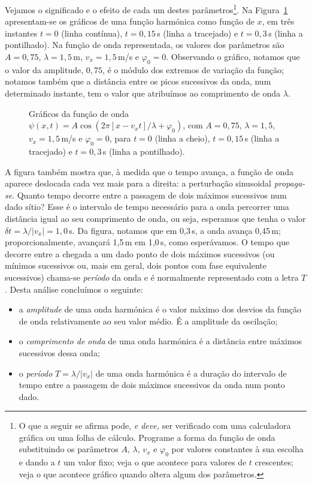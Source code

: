 Vejamos o significado e o efeito de cada um destes parâmetros\footnote{O que a
seguir se afirma pode, \emph{e deve,} ser verificado com uma calculadora
gráfica ou uma folha de cálculo. Programe a forma da função de onda
substituindo os parâmetros $A$, $\lambda$, $v_x$ e $\varphi_0$ por valores
constantes à sua escolha e dando a $t$ um valor fixo; veja o que acontece para
valores de $t$ crescentes; veja o que acontece gráfico quando altera algum dos
parâmetros.}.
Na Figura~\ref{fig:20-050} apresentam\--se os gráficos de uma função harmónica
como função de $x$, em três instantes $t=0$ (linha contínua), $t=0,15$\,s (linha
a tracejado) e $t=0,3$\,s (linha a pontilhado). Na função de onda representada, os
valores dos parâmetros são $A=0,75$, $\lambda=1,5$\,m, $v_x=1,5$\,m/s e
$\varphi_0=0$.  Observando o gráfico, notamos que o valor da amplitude, $0,75$,
é o módulo dos extremos de variação da função; notamos também que a distância
entre os picos sucessivos da onda, num determinado instante, tem o valor que
atribuímos ao comprimento de onda $\lambda$.
\begin{figure}[htb]
{\centering
    \par
}
\caption{Gráficos da função de onda
$\psi(x,t)=A\cos(2\pi[x-v_xt]/\lambda+\varphi_0)$, com $A=0,75$, $\lambda=1,5$,
$v_x=1,5$\,m/s e $\varphi_0=0$, para $t=0$ (linha a cheio), $t=0,15$\,s (linha a
tracejado) e $t=0,3$\,s (linha a pontilhado).\label{fig:20-050}}
\end{figure}
A figura também mostra que, à medida que o tempo avança, a função de onda
aparece deslocada cada vez mais para a direita: a perturbação sinusoidal
\emph{propaga-se}. Quanto tempo decorre entre a passagem de dois máximos
sucessivos num dado sítio? Esse é o intervalo de tempo necessário para a onda
percorrer uma distância igual ao seu comprimento de onda, ou seja, esperamos que
tenha o valor $\delta t=\lambda/|v_x|=1,0$\,s. Da figura, notamos que em 0,3\,s,
a onda avança 0,45\,m; proporcionalmente, avançará 1,5\,m em 1,0\,s, como
esperávamos. O tempo que decorre entre a chegada a um dado ponto de dois máximos
sucessivos (ou mínimos sucessivos ou, mais em geral, dois pontos com fase
equivalente sucessivos) chama-se \emph{período} da onda e é normalmente
representado com a letra $T$.  Desta análise concluímos o seguinte:
\begin{itemize}
\item
    a \emph{amplitude} de uma onda harmónica é o valor máximo dos desvios da
    função de onda relativamente ao seu valor médio. É a amplitude da oscilação;
\item
    o \emph{comprimento de onda} de uma onda harmónica é a distância entre
    máximos sucessivos dessa onda;
\item
    o \emph{período} $T=\lambda/|v_x|$ de uma onda harmónica é a duração do
    intervalo de tempo entre a passagem de dois máximos sucessivos da onda num
    ponto dado.
\end{itemize}
